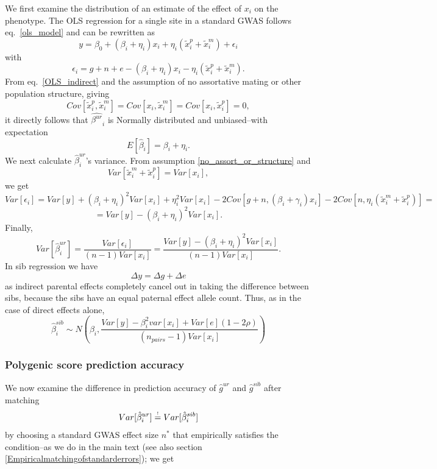 \documentclass[hidelinks, 12pt]{article}
\begin{document}
We first examine the distribution of an estimate of the effect of $x_i$ on the phenotype.  The OLS regression for a single site in a standard GWAS follows eq.~\ref{ols_model} and can be rewritten as
\begin{equation}
\label{OLS_indirect}
y=\beta_0+(\beta_i+\eta_i)x_i+\eta_i(\tilde{x}_i^p+\tilde{x}_i^m)+\epsilon_i
\end{equation}
with
$$\epsilon_i=g+n+e-(\beta_i+\eta_i)x_i-\eta_i(\tilde{x}_i^p+\tilde{x}_i^m).$$
From eq.~\ref{OLS_indirect} and the assumption of no assortative mating or other population structure, giving 
\begin{equation}
\label{no_assort_or_structure}
Cov[\tilde{x}_i^p,\tilde{x}_i^m]=Cov[x_i,\tilde{x}_i^m]=Cov[x_i,\tilde{x}_i^p]=0,
\end{equation}
it directly follows that $\hat{\beta^{ur}}_i$ is Normally distributed and unbiased--with expectation 
$$E[\hat{\beta}_i]=\beta_i+\eta_i.$$
We next calculate $\hat{\beta}_i^{ur}$'s variance. From assumption \ref{no_assort_or_structure} and 
$$Var[\tilde{x}_i^m+\tilde{x}_i^p]=Var[x_i],$$
we get
$$Var[\epsilon_i]=Var[y]+(\beta_i+\eta_i)^2Var[x_i]+\eta_i^2Var[x_i]-2Cov[g+n,(\beta_i+\gamma_i)x_i]-2Cov[n,\eta_i(\tilde{x}_i^m+\tilde{x}_i^p)]=$$
$$=Var[y]-(\beta_i+\eta_i)^2Var[x_i].$$
Finally,
$$Var[\hat{\beta}_i^{ur}]=\frac{Var[\epsilon_i]}{(n-1)Var[x_i]}=\frac{Var[y]-(\beta_i+\eta_i)^2Var[x_i]}{(n-1)Var[x_i]}.$$
In sib regression we have
$$\Delta y=\Delta g+\Delta e$$
as indirect parental effects completely cancel out in taking the difference between sibs, because the sibs have an equal paternal effect allele count. Thus, as in the case of direct effects alone, 
$$\hat{\beta}_i^{sib} \sim N(\beta_i,\frac{Var[y] - \beta_i^2var[x_i] + Var[e](1-2\rho)}{(n_{pairs}-1) Var[x_i]})$$

\subsubsection{Polygenic score prediction accuracy}
We now examine the difference in prediction accuracy of $\hat{g}^{ur}$ and $\hat{g}^{sib}$ after matching 
\begin{equation}
\label{matching_errors_indirect}
Var[\hat{\beta}_i^{ur}] \reqeq Var[\hat{\beta}_i^{sib}]
\end{equation}
by choosing a standard GWAS effect size $n^*$ that empirically satisfies the condition--as we do in the main text (see also section \ref{Empiricalmatchingofstandarderrors}); we get
\end{document}
